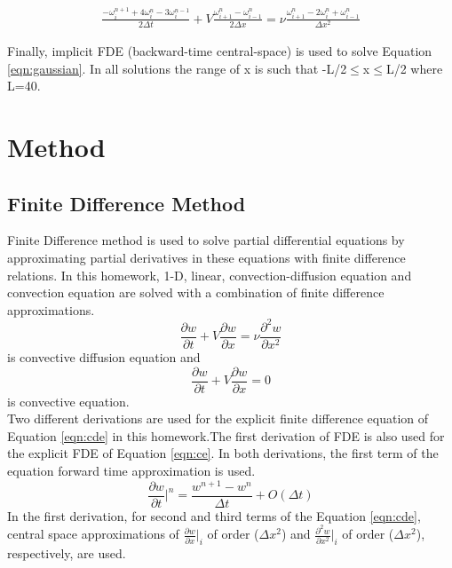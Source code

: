 \documentclass[letterpaper,12pt]{article}
\begin{document}
\begin{eqnarray}
\frac{-\omega^{n+1}_{i}+4\omega^{n}_{i}-3\omega^{n-1}_{i}}{2\Delta t} + V\frac{\omega^{n}_{i+1}-\omega^{n}_{i-1}}{2\Delta x} = \nu\frac{\omega^{n}_{i+1}-2\omega^{n}_{i}+\omega^{n}_{i-1}}{\Delta x^2}
\end{eqnarray}

Finally, implicit FDE (backward-time central-space) is used to solve Equation \ref{eqn:gaussian}.
In all solutions the range of x is such that -L/2$\leq$x$\leq$L/2 where L=40.

\newpage

\section{Method}
\subsection{Finite Difference Method}
Finite Difference method is used to solve partial differential equations by 
approximating partial derivatives in these equations with finite difference relations.
In this homework, 1-D, linear, convection-diffusion equation and convection equation are solved
with a combination of finite difference approximations.
\begin{equation}
	\frac{\partial w}{\partial t} + V\frac{\partial w}{\partial x}=\nu\frac{\partial^2 w}{\partial x^2}
	\label{eqn:cde}
\end{equation}
is convective diffusion equation and
\begin{equation}
	\frac{\partial w}{\partial t} + V\frac{\partial w}{\partial x}=0 
	\label{eqn:ce}
\end{equation}
is convective equation.\\
Two different derivations are used for the explicit finite difference equation of 
Equation \ref{eqn:cde} in this homework.The first derivation of FDE is also used for the explicit 
FDE of Equation \ref{eqn:ce}. In both derivations, the first term of
the equation forward time approximation is used.
\begin{equation}
	\frac{\partial w}{\partial t}\vert^{n}=\frac{w^{n+1}-{w^n}}{\Delta t}+O(\Delta t)
	\label{eqn:ft}
\end{equation}
In the first derivation, for second and third terms of the Equation \ref{eqn:cde}, 
central space approximations of
$\frac{\partial w}{\partial x}\vert_{i}$ of order ($\Delta x^2$) and 
$\frac{\partial^2 w}{\partial x^2}\vert_{i}$ of order ($\Delta x^2$), respectively, are used.
\end{document}
